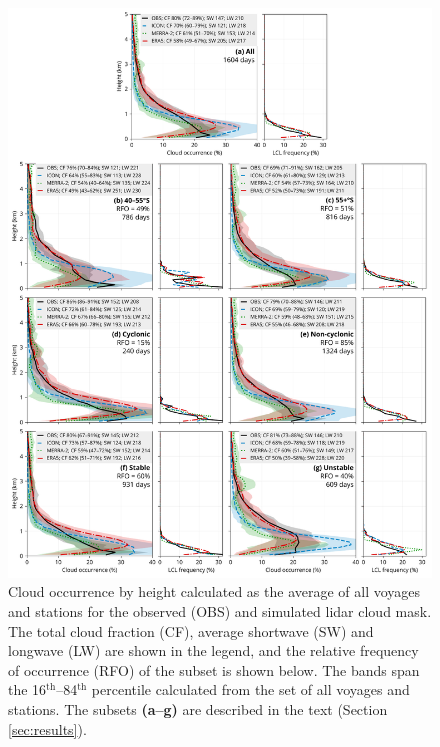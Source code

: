 \documentclass[12pt,a4paper]{article}
\begin{document}
\begin{figure}
\centering
\includegraphics[width=\textwidth]{img/cl_agg.pdf}
\caption{
Cloud occurrence by height calculated as the average of all voyages and
stations for the observed (OBS) and simulated lidar cloud mask. The total cloud
fraction (CF), average shortwave (SW) and longwave (LW) are shown in the
legend, and the relative frequency of occurrence (RFO) of the subset is shown
below.  The bands span the 16$^\mathrm{th}$--84$^\mathrm{th}$ percentile
calculated from the set of all voyages and stations. The subsets
\textbf{(a--g)} are described in the text (Section \ref{sec:results}).
}
\label{fig:cloud-occurrence}
\end{figure}
\end{document}
